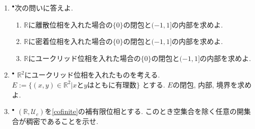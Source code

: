\documentclass[dvipdfmx,a4paper,11pt]{article}
\newcommand{\R}{\mathbb{R}}
\theoremstyle{definition}
\begin{document}
\begin{enumerate}[label=\textbf{問}\ref*{sec-subspace}.\arabic*]
\setlength{\parskip}{0cm}
  \setlength{\itemsep}{7pt} 
\item $^\bullet$次の問いに答えよ.
\begin{enumerate}
\setlength{\parskip}{0cm}
  \setlength{\itemsep}{0pt} 
\item $\R$に離散位相を入れた場合の$\{ 0\}$の閉包と$(-1,1]$の内部を求めよ.
\item $\R$に密着位相を入れた場合の$\{ 0\}$の閉包と$(-1,1]$の内部を求めよ.
\item $\R$にユークリッド位相を入れた場合の$\{ 0\}$の閉包と$(-1,1]$の内部を求めよ.
\end{enumerate}




  


  \item $^\bullet$ $\R^2$にユークリッド位相を入れたものを考える. $E:= \{ (x,y)  \in \R^2| \text{$x$と$y$はともに有理数}\}$
とする. $E$の閉包, 内部, 境界を求めよ. 

\item $^{\bullet}$ $(\R, \mathscr{U}_c)$を\ref{cofinite}の補有限位相とする. 
このとき空集合を除く任意の開集合が稠密であることを示せ.



\end{enumerate}
\end{document}
